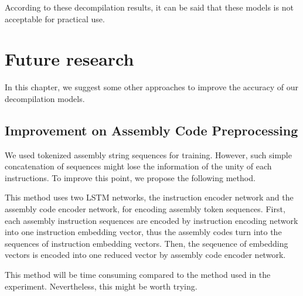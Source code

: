\documentclass[senior,final,11pt]{iscs-thesis}
\begin{document}
According to these decompilation results, it can be said that these models is not acceptable for practical use.






\chapter{Future research}
In this chapter, we suggest some other approaches to improve the accuracy of our decompilation models.

\section{Improvement on Assembly Code Preprocessing}
We used tokenized assembly string sequences for training. 
However, such simple concatenation of sequences might lose the information of the unity of each instructions.
To improve this point, we propose the following method.

This method uses two LSTM networks, the instruction encoder network and the assembly code encoder network, for encoding assembly token sequences.
First, each assembly instruction sequences are encoded by instruction encoding network into one instruction embedding vector, 
thus the assembly codes turn into the sequences of instruction embedding vectors.
Then, the seqeuence of embedding vectors is encoded into one reduced vector by assembly code encoder network.

This method will be time consuming compared to the method used in the experiment.
Nevertheless, this might be worth trying.
\end{document}
